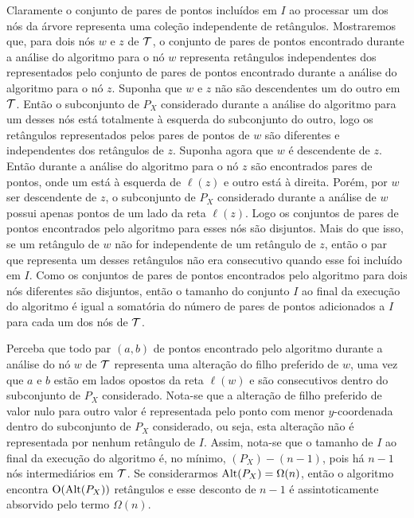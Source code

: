 Claramente o conjunto de pares de pontos incluídos em $I$ ao processar um dos nós da árvore representa uma coleção independente de retângulos. Mostraremos que, para dois nós $w$ e $z$ de $\mathcal{T}$, o conjunto de pares de pontos encontrado durante a análise do algoritmo para o nó $w$ representa retângulos independentes dos representados pelo conjunto de pares de pontos encontrado durante a análise do algoritmo para o nó $z$. Suponha que $w$ e $z$ não são descendentes um do outro em $\mathcal{T}$. Então o subconjunto de $P_X$ considerado durante a análise do algoritmo para um desses nós está totalmente à esquerda do subconjunto do outro, logo os retângulos representados pelos pares de pontos de $w$ são diferentes e independentes dos retângulos de $z$. Suponha agora que $w$ é descendente de $z$. Então durante a análise do algoritmo para o nó $z$ são encontrados pares de pontos, onde um está à esquerda de $\ell(z)$ e outro está à direita. Porém, por $w$ ser descendente de $z$, o subconjunto de $P_X$ considerado durante a análise de $w$ possui apenas pontos de um lado da reta $\ell(z)$. Logo os conjuntos de pares de pontos encontrados pelo algoritmo para esses nós são disjuntos. Mais do que isso, se um retângulo de $w$ não for independente de um retângulo de $z$, então o par que representa um desses retângulos não era consecutivo quando esse foi incluído em $I$. Como os conjuntos de pares de pontos encontrados pelo algoritmo para dois nós diferentes são disjuntos, então o tamanho do conjunto $I$ ao final da execução do algoritmo é igual a somatória do número de pares de pontos adicionados a $I$ para cada um dos nós de $\mathcal{T}$.

Perceba que todo par $(a,b)$ de pontos encontrado pelo algoritmo durante a análise do nó $w$ de $\mathcal{T}$ representa uma alteração do filho preferido de $w$, uma vez que $a$ e $b$ estão em lados opostos da reta $\ell(w)$ e são consecutivos dentro do subconjunto de $P_X$ considerado. Nota-se que a alteração de filho preferido de valor nulo para outro valor é representada pelo ponto com menor $y$-coordenada dentro do subconjunto de $P_X$ considerado, ou seja, esta alteração não é representada por nenhum retângulo de $I$. Assim, nota-se que o tamanho de $I$ ao final da execução do algoritmo é, no mínimo, \Alt$(P_X) - (n - 1)$, pois há $n - 1$ nós intermediários em $\mathcal{T}$. Se considerarmos $\mathrm{Alt}(P_X) = \Omega(n)$, então o algoritmo encontra $\mathrm{O}(\mathrm{Alt}(P_X))$ retângulos e esse desconto de $n - 1$ é assintoticamente absorvido pelo termo $\Omega(n)$.


